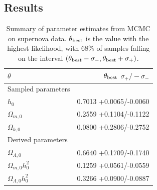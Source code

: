 \documentclass[aps,prl,twocolumn,groupedaddress,nofootinbib]{revtex4-2}
\begin{document}
\subsection{Results}
\begin{table}
    \caption{\label{tab:results1}Summary of parameter estimates from MCMC on supernova data. $\theta_{\rm best}$ is the value with the highest likelihood, with 68\% of samples falling on the interval $(\theta_{\rm best} - \sigma_-, \theta_{\rm best} + \sigma_+)$.}
    \begin{ruledtabular}
        \begin{tabular}{l r}
            $\theta$                  & $\theta_{\rm best}$ $\sigma_+/-\sigma_-$ \\
            \hline
            \footnotesize{Sampled parameters}                                    \\
            $h_0$                     & 0.7013 +0.0065/-0.0060                   \\
            $\Omega_{m,0}$            & 0.2559 +0.1104/-0.1122                   \\
            $\Omega_{k,0}$            & 0.0800 +0.2806/-0.2752                   \\
            \hline
            \footnotesize{Derived parameters}                                    \\
            $\Omega_{\Lambda,0}$      & 0.6640 +0.1709/-0.1740                   \\
            $\Omega_{m,0}h_0^2$       & 0.1259 +0.0561/-0.0559                   \\
            $\Omega_{\Lambda,0}h_0^2$ & 0.3266 +0.0900/-0.0887                   \\
        \end{tabular}
    \end{ruledtabular}
\end{table}
\end{document}
